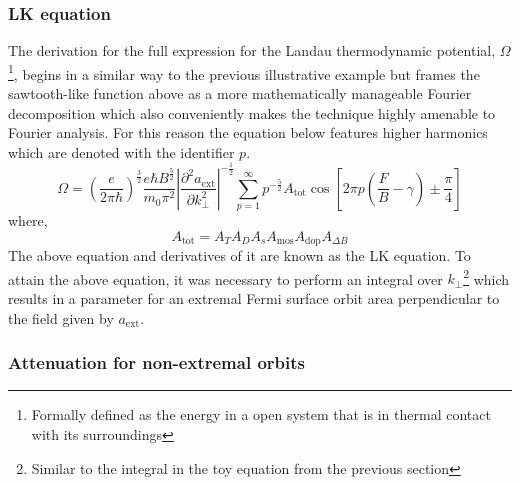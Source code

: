 \subsubsection{\acl{LK} equation}

The derivation for the full expression for the Landau thermodynamic potential, $\Omega$\footnote{Formally defined as the energy in a open system that is in thermal contact with its surroundings}, begins in a similar way to the previous illustrative example but frames the sawtooth-like function above as a more mathematically manageable Fourier decomposition which also conveniently makes the technique highly amenable to Fourier analysis. For this reason the equation below features higher harmonics which are denoted with the identifier $p$.
\begin{equation}
\Omega = \left(\frac{e}{2\pi\hbar}\right)^{\frac{3}{2}}\frac{e\hbar B^{\frac{5}{2}}}{m_0 \pi^2}\left| \frac{\partial^2 a_{\textrm{ext}}}{\partial k^2_\perp}\right|^{-\frac{1}{2}}\sum_{p=1}^{\infty}p^{-\frac{5}{2}}A_{\textrm{tot}}\cos\left[2\pi p\left(\frac{F}{B} - \gamma\right)\pm\frac{\pi}{4}\right]
\end{equation}
where,
\begin{equation}
A_{\textrm{tot}} = A_T A_D A_s A_{\textrm{mos}} A_{\textrm{dop}} A_{\Delta B}
\end{equation}
The above equation and derivatives of it are known as the \ac{LK} equation. To attain the above equation, it was necessary to perform an integral over $k_\perp$\footnote{Similar to the integral in the toy equation from the previous section} which results in a parameter for an extremal Fermi surface orbit area perpendicular to the field given by $a_{\textrm{ext}}$. 

\subsubsection{Attenuation for non-extremal orbits}

